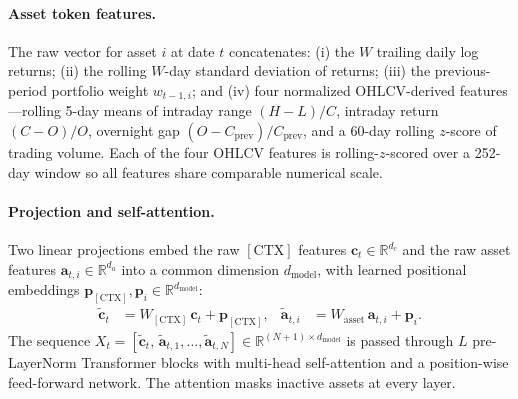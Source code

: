 \documentclass[11pt]{article}
\newcommand{\R}{\mathbb{R}}
\newcommand{\CTX}{[\mathrm{CTX}]}
\begin{document}
\paragraph{Asset token features.} The raw vector for asset $i$ at date
$t$ concatenates: (i) the $W$ trailing daily log returns; (ii) the
rolling $W$-day standard deviation of returns; (iii) the previous-period
portfolio weight $w_{t-1,i}$; and (iv) four normalized OHLCV-derived
features---rolling 5-day means of intraday range $(H-L)/C$, intraday
return $(C-O)/O$, overnight gap $(O - C_{\text{prev}})/C_{\text{prev}}$,
and a 60-day rolling $z$-score of trading volume. Each of the four
OHLCV features is rolling-$z$-scored over a 252-day window so all
features share comparable numerical scale.

\paragraph{Projection and self-attention.} Two linear projections embed
the raw $\CTX$ features $\mathbf{c}_t \in \R^{d_c}$ and the raw asset
features $\mathbf{a}_{t,i} \in \R^{d_a}$ into a common dimension
$d_{\text{model}}$, with learned positional embeddings
$\mathbf{p}_{\CTX}, \mathbf{p}_i \in \R^{d_{\text{model}}}$:
\begin{align}
\tilde{\mathbf{c}}_t &= W_{\CTX}\, \mathbf{c}_t + \mathbf{p}_{\CTX}, &
\tilde{\mathbf{a}}_{t,i} &= W_{\text{asset}}\, \mathbf{a}_{t,i} + \mathbf{p}_i.
\end{align}
The sequence $X_t = [\tilde{\mathbf{c}}_t,\, \tilde{\mathbf{a}}_{t,1},
\ldots,\tilde{\mathbf{a}}_{t,N}] \in \R^{(N+1)\times d_{\text{model}}}$
is passed through $L$ pre-LayerNorm Transformer blocks
\citep{vaswani2017,xiong2020} with multi-head self-attention and a
position-wise feed-forward network. The attention masks inactive assets
at every layer.
\end{document}
